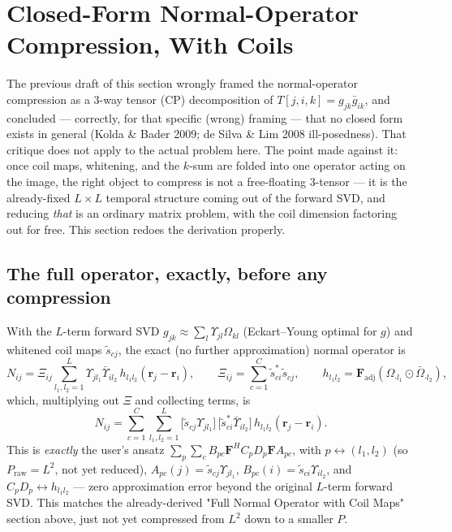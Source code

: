 \documentclass{article}
\begin{document}
\section{Closed-Form Normal-Operator Compression, With Coils}
\label{sec:tensor_theory}

The previous draft of this section wrongly framed the normal-operator compression as a 3-way
tensor (CP) decomposition of $T[j,i,k]=g_{jk}\bar g_{ik}$, and concluded — correctly, for that
specific (wrong) framing — that no closed form exists in general (Kolda \& Bader 2009; de Silva
\& Lim 2008 ill-posedness). That critique does not apply to the actual problem here. The point
made against it: once coil maps, whitening, and the $k$-sum are folded into one operator acting
on the image, the right object to compress is not a free-floating 3-tensor — it is the
already-fixed $L\times L$ temporal structure coming out of the forward SVD, and reducing
\emph{that} is an ordinary matrix problem, with the coil dimension factoring out for free. This
section redoes the derivation properly.

\subsection{The full operator, exactly, before any compression}

With the $L$-term forward SVD $g_{jk}\approx\sum_l \Upsilon_{jl}\Omega_{kl}$ (Eckart--Young
optimal for $g$) and whitened coil maps $\tilde s_{cj}$, the exact (no further approximation)
normal operator is
\begin{equation}
    N_{ij} = \Xi_{ij}\sum_{l_1,l_2=1}^L \Upsilon_{jl_1}\bar\Upsilon_{il_2}\,h_{l_1l_2}(\mathbf{r}_j-\mathbf{r}_i),
    \qquad \Xi_{ij}=\sum_{c=1}^C \tilde s^*_{ci}\tilde s_{cj},
    \qquad h_{l_1l_2}=\mathbf{F}_{\mathrm{adj}}(\Omega_{\cdot l_1}\odot\bar\Omega_{\cdot l_2}),
    \label{eq:N_exact_coils}
\end{equation}
which, multiplying out $\Xi$ and collecting terms, is
\begin{equation}
    N_{ij} = \sum_{c=1}^C\sum_{l_1,l_2=1}^L
        \bigl[\tilde s_{cj}\Upsilon_{jl_1}\bigr]\,\bigl[\tilde s^*_{ci}\bar\Upsilon_{il_2}\bigr]\,
        h_{l_1l_2}(\mathbf{r}_j-\mathbf{r}_i).
    \label{eq:N_raw_LC}
\end{equation}
This is \emph{exactly} the user's ansatz $\sum_p\sum_c B_{pc}\mathbf{F}^HC_pD_p\mathbf{F}A_{pc}$,
with $p\leftrightarrow(l_1,l_2)$ (so $P_{\mathrm{raw}}=L^2$, not yet reduced), $A_{pc}(j)=\tilde
s_{cj}\Upsilon_{jl_1}$, $B_{pc}(i)=\tilde s_{ci}\Upsilon_{il_2}$, and $C_pD_p\leftrightarrow
h_{l_1l_2}$ — zero approximation error beyond the original $L$-term forward SVD. This matches
the already-derived "Full Normal Operator with Coil Maps" section above, just not yet compressed
from $L^2$ down to a smaller $P$.
\end{document}
